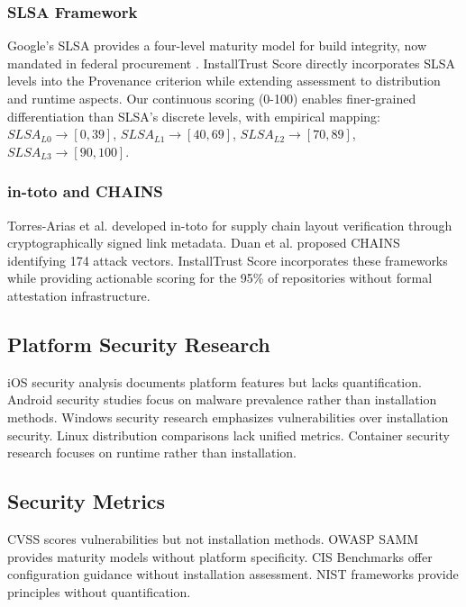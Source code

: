 \documentclass[11pt,a4paper]{article}
\begin{document}
\subsubsection{SLSA Framework} 
Google's SLSA \cite{google2021slsa} provides a four-level maturity model for build integrity, now mandated in federal procurement \cite{cisa2024sbom}. InstallTrust Score directly incorporates SLSA levels into the Provenance criterion while extending assessment to distribution and runtime aspects. Our continuous scoring (0-100) enables finer-grained differentiation than SLSA's discrete levels, with empirical mapping: $SLSA_{L0} \rightarrow [0,39]$, $SLSA_{L1} \rightarrow [40,69]$, $SLSA_{L2} \rightarrow [70,89]$, $SLSA_{L3} \rightarrow [90,100]$.

\subsubsection{in-toto and CHAINS}
Torres-Arias et al. \cite{torres2019intoto} developed in-toto for supply chain layout verification through cryptographically signed link metadata. Duan et al. \cite{duan2021measuring} proposed CHAINS identifying 174 attack vectors. InstallTrust Score incorporates these frameworks while providing actionable scoring for the 95\% of repositories without formal attestation infrastructure.

\subsection{Platform Security Research}
iOS security analysis \cite{apple2023security,liu2024ios} documents platform features but lacks quantification. Android security studies \cite{chen2023android,zimmermann2019npm} focus on malware prevalence rather than installation methods. Windows security research \cite{microsoft2024windows} emphasizes vulnerabilities over installation security. Linux distribution comparisons \cite{anderson2024linux} lack unified metrics. Container security research \cite{wang2023container,kubernetes2024security} focuses on runtime rather than installation.

\subsection{Security Metrics}
CVSS \cite{first2019cvss} scores vulnerabilities but not installation methods. OWASP SAMM \cite{owasp2020samm} provides maturity models without platform specificity. CIS Benchmarks offer configuration guidance without installation assessment. NIST frameworks \cite{nist2024ssdf,nist2024zerotrust} provide principles without quantification.
\end{document}
